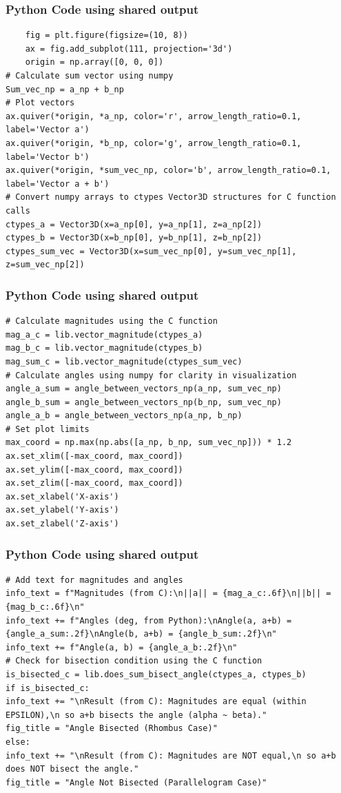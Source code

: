 \documentclass{beamer}
\begin{document}
		\begin{frame}[fragile]
			\frametitle{Python Code using shared output}
			\begin{lstlisting}
	fig = plt.figure(figsize=(10, 8))
	ax = fig.add_subplot(111, projection='3d')
	origin = np.array([0, 0, 0])
# Calculate sum vector using numpy
Sum_vec_np = a_np + b_np
# Plot vectors
ax.quiver(*origin, *a_np, color='r', arrow_length_ratio=0.1, label='Vector a')
ax.quiver(*origin, *b_np, color='g', arrow_length_ratio=0.1, label='Vector b')
ax.quiver(*origin, *sum_vec_np, color='b', arrow_length_ratio=0.1, label='Vector a + b')
# Convert numpy arrays to ctypes Vector3D structures for C function calls
ctypes_a = Vector3D(x=a_np[0], y=a_np[1], z=a_np[2])
ctypes_b = Vector3D(x=b_np[0], y=b_np[1], z=b_np[2])
ctypes_sum_vec = Vector3D(x=sum_vec_np[0], y=sum_vec_np[1], z=sum_vec_np[2])
			\end{lstlisting}
		\end{frame}
		\begin{frame}[fragile]
			\frametitle{Python Code using shared output}
			\begin{lstlisting}
# Calculate magnitudes using the C function
mag_a_c = lib.vector_magnitude(ctypes_a)
mag_b_c = lib.vector_magnitude(ctypes_b)
mag_sum_c = lib.vector_magnitude(ctypes_sum_vec)
# Calculate angles using numpy for clarity in visualization
angle_a_sum = angle_between_vectors_np(a_np, sum_vec_np)
angle_b_sum = angle_between_vectors_np(b_np, sum_vec_np)
angle_a_b = angle_between_vectors_np(a_np, b_np)
# Set plot limits
max_coord = np.max(np.abs([a_np, b_np, sum_vec_np])) * 1.2
ax.set_xlim([-max_coord, max_coord])
ax.set_ylim([-max_coord, max_coord])
ax.set_zlim([-max_coord, max_coord])
ax.set_xlabel('X-axis')
ax.set_ylabel('Y-axis')
ax.set_zlabel('Z-axis')
			\end{lstlisting}
		\end{frame}
		\begin{frame}[fragile]
			\frametitle{Python Code using shared output}
			\begin{lstlisting}
# Add text for magnitudes and angles
info_text = f"Magnitudes (from C):\n||a|| = {mag_a_c:.6f}\n||b|| = {mag_b_c:.6f}\n"
info_text += f"Angles (deg, from Python):\nAngle(a, a+b) = {angle_a_sum:.2f}\nAngle(b, a+b) = {angle_b_sum:.2f}\n"
info_text += f"Angle(a, b) = {angle_a_b:.2f}\n"
# Check for bisection condition using the C function
is_bisected_c = lib.does_sum_bisect_angle(ctypes_a, ctypes_b)
if is_bisected_c:
info_text += "\nResult (from C): Magnitudes are equal (within EPSILON),\n so a+b bisects the angle (alpha ~ beta)."
fig_title = "Angle Bisected (Rhombus Case)"
else:
info_text += "\nResult (from C): Magnitudes are NOT equal,\n so a+b does NOT bisect the angle."
fig_title = "Angle Not Bisected (Parallelogram Case)"
			
			\end{lstlisting}
		\end{frame}
\end{document}
